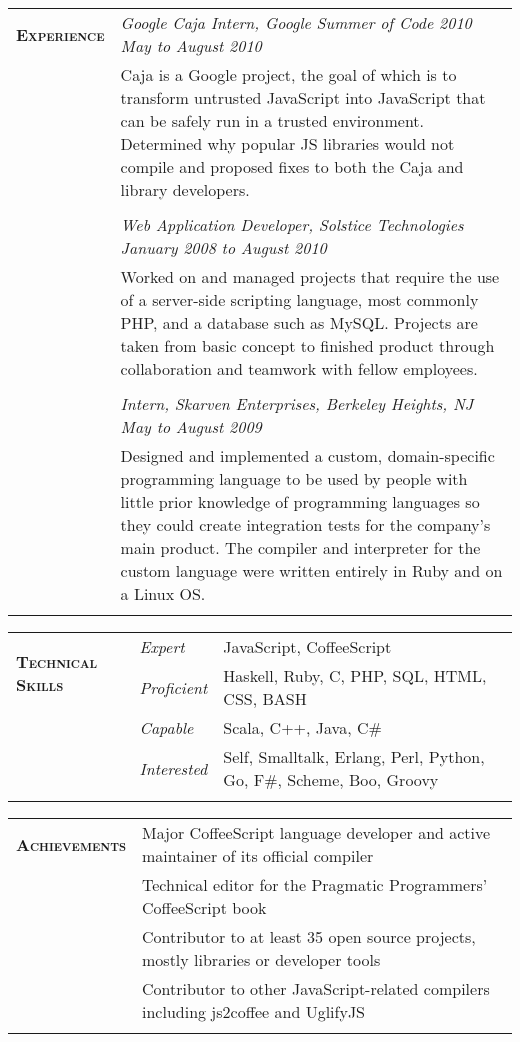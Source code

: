 \documentclass{report}
\newcommand{\sectiontitle}[1]{{\large \textsc{\textbf{#1}}}}
\newcommand{\gutterwidth}[0]{3.3cm}
\newcommand{\extralinespacing}[0]{0.15cm}
\begin{document}
\begin{tabular}{@{}p{\gutterwidth}p{13cm}@{}}
  \sectiontitle{Experience}
      &  {\em Google Caja Intern, Google Summer of Code 2010 \hfill May to August 2010} \\
  {}  &  Caja is a Google project, the goal of which is to transform untrusted JavaScript into JavaScript that can be
  safely run in a trusted environment. Determined why popular JS libraries would not compile and proposed fixes to both
  the Caja and library developers.
  \\ \\
  {}  &  {\em Web Application Developer, Solstice Technologies \hfill January 2008 to August 2010} \\
  {}  &  Worked on and managed projects that require the use of a server-side scripting language, most commonly PHP, and
  a database such as MySQL. Projects are taken from basic concept to finished product through collaboration and teamwork
  with fellow employees.
  \\ \\
  {}  &  {\em Intern, Skarven Enterprises, Berkeley Heights, NJ \hfill May to August 2009} \\
  {}  &  Designed and implemented a custom, domain-specific programming language to be used by people with little prior
  knowledge of programming languages so they could create integration tests for the company's main product. The compiler
  and interpreter for the custom language were written entirely in Ruby and on a Linux OS.
  \\ \\
\end{tabular}

\begin{tabular}{@{}p{\gutterwidth}p{1.5cm}p{11.5cm}@{}}
  \multirow{2}{\gutterwidth}{\sectiontitle{Technical Skills}}
      &  {\em Expert}      &  JavaScript, CoffeeScript \\[\extralinespacing]
  {}  &  {\em Proficient}  &  Haskell, Ruby, C, PHP, SQL, HTML, CSS, BASH \\[\extralinespacing]
  {}  &  {\em Capable}     &  Scala, C++, Java, C\# \\[\extralinespacing]
  {}  &  {\em Interested}  &  Self, Smalltalk, Erlang, Perl, Python, Go, F\#, Scheme, Boo, Groovy \\
  \\
\end{tabular}

\begin{tabular}{@{}p{\gutterwidth}p{13cm}@{}}
  \sectiontitle{Achievements}
     & Major CoffeeScript language developer and active maintainer of its official compiler \\[\extralinespacing]
  {} & Technical editor for the Pragmatic Programmers' CoffeeScript book \\[\extralinespacing]
  {} & Contributor to at least 35 open source projects, mostly libraries or developer tools \\[\extralinespacing]
  {} & Contributor to other JavaScript-related compilers including js2coffee and UglifyJS \\
  \\
\end{tabular}
\end{document}
